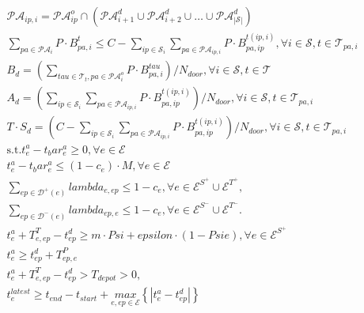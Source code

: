 \begin{align}
  & \mathcal{PA}_{ip , i} = \mathcal{PA}_{ip}^{o} \cap \left(\mathcal{PA}_{i + 1}^{d} \cup \mathcal{PA}_{i + 2}^{d} \cup \hdots \cup \mathcal{PA}_{\left|\mathcal{S}\right|}^{d}\right) \tag{eq\_0057} \\
  & \sum_{p a \in \mathcal{PA}_{i}} P \cdot B_{p a , i}^{t} \leq C - \sum_{ip \in \mathcal{S}_{i}} \underset{p a \in \mathcal{PA}_{ip , i}}{\sum} P \cdot B_{p a , ip}^{t \left(ip , i\right)} , \forall i \in \mathcal{S} , t \in \mathcal{T}_{p a , i} \tag{eq\_0058} \\
  & B_{d} = \left(\sum_{\mathit{tau} \in \mathcal{T}_{t}, p a \in \mathcal{PA}_{i}^{o}} P \cdot B_{p a , i}^{\mathit{tau}}\right) / N_{d o o r} , \forall i \in \mathcal{S} , t \in \mathcal{T} \tag{eq\_0062} \\
  & A_{d} = \left(\sum_{ip \in \mathcal{S}_{i}} \underset{p a \in \mathcal{PA}_{ip , i}}{\sum} P \cdot B_{p a , ip}^{t \left(ip , i\right)}\right) / N_{d o o r} , \forall i \in \mathcal{S} , t \in \mathcal{T}_{p a , i} \tag{eq\_0064} \\
  & T \cdot S_{d} = \left(C - \sum_{ip \in \mathcal{S}_{i}} \underset{p a \in \mathcal{PA}_{ip , i}}{\sum} P \cdot B_{p a , ip}^{t \left(ip , i\right)}\right) / N_{d o o r} , \forall i \in \mathcal{S} , t \in \mathcal{T}_{p a , i} \tag{eq\_0065} \\
  & \text{s}.\text{t}. t_{e}^{a} - t_bar_{e}^{a} \geq 0 , \forall e \in \mathcal{E} \tag{eq\_0070} \\
  & t_{e}^{a} - t_bar_{e}^{a} \leq \left(1 - c_{e}\right) \cdot M , \forall e \in \mathcal{E} \tag{eq\_0071} \\
  & \sum_{ep \in \mathcal{D}^{+} \left(e\right)} \mathit{lambda}_{e , ep} \leq 1 - c_{e} , \forall e \in \mathcal{E}^{S^{+}} \cup \mathcal{E}^{T^{+}} , \tag{eq\_0080} \\
  & \sum_{ep \in \mathcal{D}^{-} \left(e\right)} \mathit{lambda}_{ep , e} \leq 1 - c_{e} , \forall e \in \mathcal{E}^{S^{-}} \cup \mathcal{E}^{T^{-}} . \tag{eq\_0082} \\
  & t_{e}^{a} + T_{e , ep}^{T} - t_{ep}^{d} \geq m \cdot \mathit{Psi} + \mathit{epsilon} \cdot \left(1 - \mathit{Psi} e\right) , \forall e \in \mathcal{E}^{S^{+}} \tag{eq\_0083} \\
  & t_{e}^{a} \geq t_{ep}^{d} + T_{ep , e}^{P} \tag{eq\_0084} \\
  & t_{e}^{a} + T_{e , ep}^{T} - t_{ep}^{d} > T_{d e p o t} > 0 , \tag{eq\_0085} \\
  & t_{e}^{l a t e s t} \geq t_{e n d} - t_{s t a r t} + \underset{e , ep \in \mathcal{E}}{max} \left\{\left|t_{e}^{a} - t_{ep}^{d}\right|\right\} \tag{eq\_0086} \\
\end{align}
